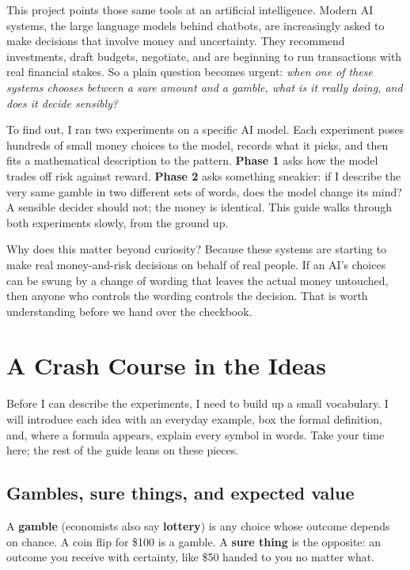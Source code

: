 \documentclass[11pt]{article}
\newcommand{\term}[1]{\textbf{\color{mossdk}#1}}
\begin{document}
This project points those same tools at an artificial intelligence. Modern AI systems, the large
language models behind chatbots, are increasingly asked to make decisions that involve money and
uncertainty. They recommend investments, draft budgets, negotiate, and are beginning to run
transactions with real financial stakes. So a plain question becomes urgent: \emph{when one of these
systems chooses between a sure amount and a gamble, what is it really doing, and does it decide
sensibly?}

To find out, I ran two experiments on a specific AI model. Each experiment poses hundreds of small
money choices to the model, records what it picks, and then fits a mathematical description to the
pattern. \term{Phase 1} asks how the model trades off risk against reward. \term{Phase 2} asks
something sneakier: if I describe the very same gamble in two different sets of words, does the model
change its mind? A sensible decider should not; the money is identical. This guide walks through both
experiments slowly, from the ground up.

Why does this matter beyond curiosity? Because these systems are starting to make real
money-and-risk decisions on behalf of real people. If an AI's choices can be swung by a change of
wording that leaves the actual money untouched, then anyone who controls the wording controls the
decision. That is worth understanding before we hand over the checkbook.

\section{A Crash Course in the Ideas}

Before I can describe the experiments, I need to build up a small vocabulary. I will introduce each
idea with an everyday example, box the formal definition, and, where a formula appears, explain every
symbol in words. Take your time here; the rest of the guide leans on these pieces.

\subsection{Gambles, sure things, and expected value}

A \term{gamble} (economists also say \term{lottery}) is any choice whose outcome depends on chance. A
coin flip for \$100 is a gamble. A \term{sure thing} is the opposite: an outcome you receive with
certainty, like \$50 handed to you no matter what.
\end{document}
